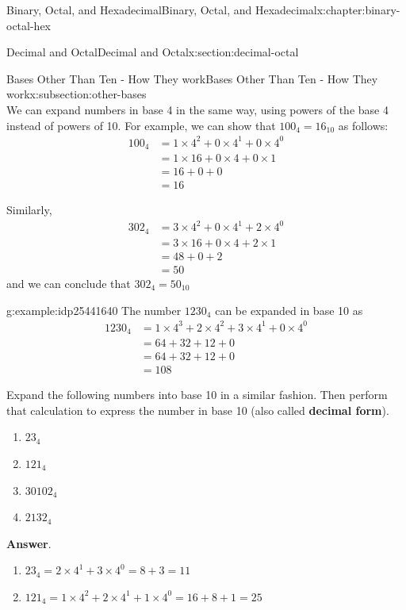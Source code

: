 \documentclass[twoside,10pt,]{book}
\newcommand{\blocktitlefont}{\relax}
\newcommand{\terminology}[1]{\textbf{#1}}
\numberwithin{equation}{section}
\newcommand{\amp}{&}
\begin{document}
\begin{chapterptx}{Binary, Octal, and Hexadecimal}{}{Binary, Octal, and Hexadecimal}{}{}{x:chapter:binary-octal-hex}
\begin{sectionptx}{Decimal and Octal}{}{Decimal and Octal}{}{}{x:section:decimal-octal}
\begin{subsectionptx}{Bases Other Than Ten - How They work}{}{Bases Other Than Ten - How They work}{}{}{x:subsection:other-bases}
\begin{equation*}
\end{equation*}
We can expand numbers in base 4 in the same way, using powers of the base 4 instead of powers of 10.  For example, we can show that \(100_4=16_{10}\) as follows:%
\begin{align*}
100_4 \amp =1\times 4^2+0\times 4^1+0\times 4^0\\
\amp =1\times 16+0\times 4+0\times 1\\
\amp =16+0+0\\
\amp =16
\end{align*}
%
\par
Similarly,%
\begin{align*}
302_4 \amp = 3\times 4^2+0\times 4^1+2\times 4^0\\
\amp = 3\times 16+0\times 4+2\times 1\\
\amp = 48+0+2\\
\amp = 50
\end{align*}
and we can conclude that \(302_4=50_{10}\)%
\begin{example}{}{g:example:idp25441640}%
The number \(1230_4\) can be expanded in base 10 as%
\begin{align*}
1230_4 \amp = 1\times 4^3+2\times 4^2+3\times 4^1+0\times 4^0\\
\amp = 64+32+12+0\\
\amp = 64+32+12+0\\
\amp = 108
\end{align*}
%
\par
Expand the following numbers into base 10 in a similar fashion.  Then perform that calculation to express the number in base 10 (also called \terminology{decimal form}).%
%
\begin{enumerate}
\item{}\(\displaystyle 23_4\)%
\item{}\(\displaystyle 121_4\)%
\item{}\(\displaystyle 30102_4\)%
\item{}\(\displaystyle 2132_4\)%
\end{enumerate}
\par\smallskip%
\noindent\textbf{\blocktitlefont Answer}.\label{g:answer:idp25449832}{}\hypertarget{g:answer:idp25449832}{}\quad{}%
\begin{enumerate}
\item{}\(\displaystyle 23_4=2\times 4^1+3\times 4^0=8+3=11\)%
\item{}\(\displaystyle 121_4=1\times 4^2+2\times 4^1+1\times 4^0=16+8+1=25\)%

\end{enumerate}
\end{example}
\end{subsectionptx}
\end{sectionptx}
\end{chapterptx}
\end{document}
